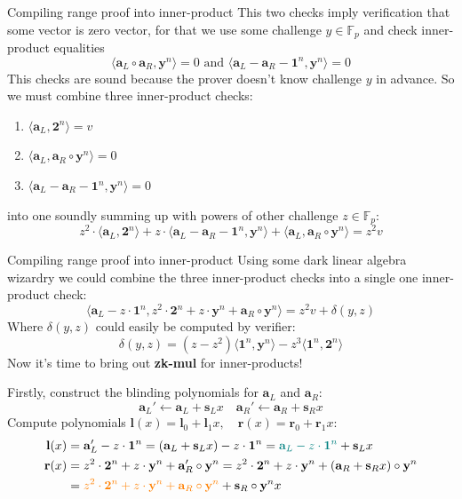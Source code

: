 \documentclass{zkdl-presentation-template}
\begin{document}
\begin{frame}{Compiling range proof into inner-product}
    This two checks imply verification that some vector is zero vector, for that we use some challenge $y \in \mathbb{F}_p$ and check inner-product equalities $$\langle \mathbf{a}_L \circ \mathbf{a}_R, \mathbf{y}^n \rangle = 0 \text{ and } \langle \mathbf{a}_L - \mathbf{a}_R - \mathbf{1}^n, \mathbf{y}^n \rangle = 0$$
    This checks are sound because the prover doesn't know challenge $y$ in advance. So we must combine three inner-product checks:
    \begin{enumerate}
    \item $\langle \mathbf{a}_L, \mathbf{2}^n \rangle = v$
    \item $\langle \mathbf{a}_L, \mathbf{a}_R \circ \mathbf{y}^n \rangle = 0$
    \item $\langle \mathbf{a}_L - \mathbf{a}_R - \mathbf{1}^n, \mathbf{y}^n \rangle = 0$
    \end{enumerate}
    into one soundly summing up with powers of other challenge $z \in \mathbb{F}_p$:
    $$z^2 \cdot \langle \mathbf{a}_L, \mathbf{2}^n \rangle + z \cdot \langle \mathbf{a}_L - \mathbf{a}_R - \mathbf{1}^n, \mathbf{y}^n \rangle + \langle \mathbf{a}_L, \mathbf{a}_R \circ \mathbf{y}^n \rangle = z^2v$$
\end{frame}

\begin{frame}{Compiling range proof into inner-product}
    Using some dark linear algebra wizardry we could combine the three inner-product checks into a single one inner-product check:
    \begin{equation*}
        \langle \mathbf{a}_L - z \cdot \mathbf{1}^n, z^2 \cdot \mathbf{2}^n + z \cdot \mathbf{y}^n + \mathbf{a}_R \circ \mathbf{y}^n\rangle = z^2v + \delta(y,z)
    \end{equation*}
    Where $\delta(y,z)$ could easily be computed by verifier:
    $$\delta(y,z) = (z-z^2)\langle \mathbf{1}^n, \mathbf{y}^n \rangle - z^3 \langle \mathbf{1}^n, \mathbf{2}^n \rangle $$
    Now it's time to bring out \textbf{zk-mul} for inner-products! 
    
    Firstly, construct the blinding polynomials for $\mathbf{a}_L$ and $\mathbf{a}_R$:
    $$\mathbf{a}_L' \gets \mathbf{a}_L + \mathbf{s}_L x \quad \mathbf{a}_R' \gets \mathbf{a}_R + \mathbf{s}_R x$$
    Compute polynomials $\mathbf{l}(x) = \mathbf{l}_0 + \mathbf{l}_1 x, \quad \mathbf{r}(x) = \mathbf{r}_0 + \mathbf{r}_1 x$:
    \begin{align*}
        \mathbf{l}(x) &= \mathbf{a}_L' - z \cdot \mathbf{1}^n = (\mathbf{a}_L + \mathbf{s}_L x) - z \cdot \mathbf{1}^n = \textcolor{teal}{\mathbf{a}_L - z \cdot \mathbf{1}^n} + \mathbf{s}_L x\\
        \mathbf{r}(x) &= z^2 \cdot \mathbf{2}^n + z \cdot \mathbf{y}^n + \mathbf{a}_R' \circ \mathbf{y}^n = z^2 \cdot \mathbf{2}^n + z \cdot \mathbf{y}^n + (\mathbf{a}_R + \mathbf{s}_R x) \circ \mathbf{y}^n \\
        & = \textcolor{orange}{z^2 \cdot \mathbf{2}^n + z \cdot \mathbf{y}^n + \mathbf{a}_R \circ \mathbf{y}^n} + \mathbf{s}_R \circ \mathbf{y}^n x
    \end{align*}
\end{frame}
\end{document}
